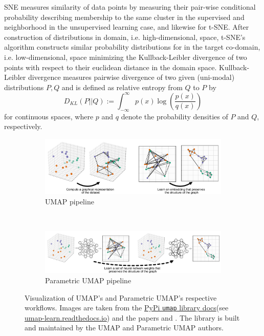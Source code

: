 \documentclass[]{article}
\renewcommand{\cite}{\citep}
\begin{document}
SNE measures similarity of data points by measuring their pair-wise conditional probability describing membership to the same cluster in the supervised and neighborhood in the unsupervised learning case, and likewise for t-SNE. After construction of distributions in domain, i.e. high-dimensional, space, t-SNE's algorithm constructs similar probability distributions for in the target co-domain, i.e. low-dimensional, space minimizing the Kullback-Leibler divergence \cite{hershey2007approximating} of two points with respect to their euclidean distance in the domain space. Kullback-Leibler divergence measures pairwise divergence of two given (uni-modal) distributions $P,Q$ and is defined as relative entropy from $Q$ to $P$ by
\begin{equation}
	\label{equ:KL_div}
	D_{KL} (P||Q) := \int_{-\infty}^\infty p(x)\log \left(\frac{p(x)}{q(x)}\right)
\end{equation}
for continuous spaces, where $p$ and $q$ denote the probability densities of $P$ and $Q$, respectively.

\begin{figure}
	\centering
	\begin{subfigure}{1.\textwidth}
		\centering
		\includegraphics[width=.90\linewidth]{figures/umap-only.png}
		\caption{UMAP pipeline}
		\label{fig:umap_vis}
	\end{subfigure}\\
	\begin{subfigure}{1.\textwidth}
		\centering
		\includegraphics[width=0.90\linewidth]{figures/pumap-only.png}
		\caption{Parametric UMAP pipeline}
		\label{fig:para_umap_vis}
	\end{subfigure}
	
	\caption[Visualization of UMAP's and Parametric UMAP's respective workflows]{Visualization of UMAP's and Parametric UMAP's respective workflows. Images are taken from the \href{https://umap-learn.readthedocs.io/en/latest/parametric_umap.html}{PyPi \texttt{umap} library docs}(see \url{umap-learn.readthedocs.io}) and the papers \citet{mcinnes2018umap} and \citet{sainburg2021parametric}. The library is built and maintained by the UMAP and Parametric UMAP authors.}
	\label{fig:umap_visualizations}
\end{figure}
\end{document}
